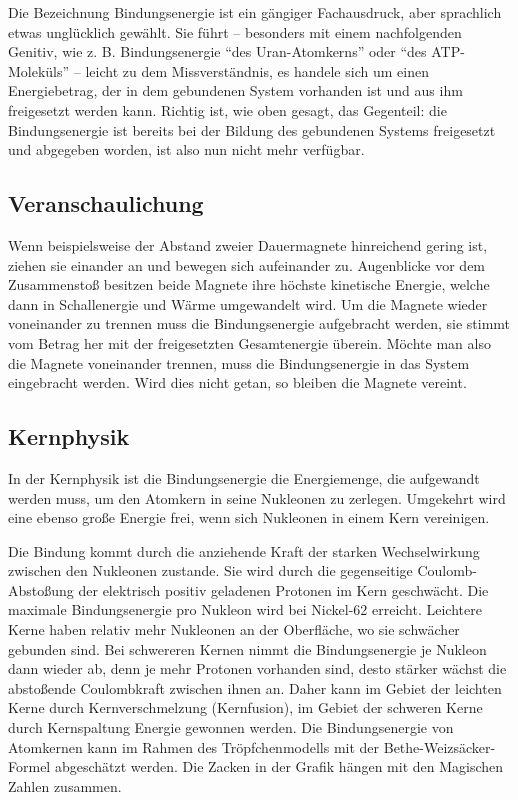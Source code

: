 \documentclass[12pt,a4paper,twoside]{article}
\begin{document}
Die Bezeichnung Bindungsenergie ist ein gängiger Fachausdruck, aber sprachlich etwas unglücklich gewählt. 
Sie führt -- besonders mit einem nachfolgenden Genitiv, wie z. B. Bindungsenergie ``des Uran-Atomkerns'' oder ``des ATP-Moleküls'' -- 
leicht zu dem Missverständnis, es handele sich um einen Energiebetrag, der in dem gebundenen System vorhanden 
ist und aus ihm freigesetzt werden kann. Richtig ist, wie oben gesagt, das Gegenteil: 
die Bindungsenergie ist bereits bei der Bildung des gebundenen Systems freigesetzt und abgegeben worden, ist also nun nicht mehr verfügbar.

\subsection*{Veranschaulichung}

Wenn beispielsweise der Abstand zweier Dauermagnete hinreichend gering ist, ziehen sie einander an und bewegen sich aufeinander zu. 
Augenblicke vor dem Zusammenstoß besitzen beide Magnete ihre höchste kinetische Energie, welche dann in Schallenergie und Wärme umgewandelt wird. 
Um die Magnete wieder voneinander zu trennen muss die Bindungsenergie aufgebracht werden, sie stimmt vom Betrag her mit der freigesetzten 
Gesamtenergie überein. Möchte man also die Magnete voneinander trennen, muss die Bindungsenergie in das System eingebracht werden. 
Wird dies nicht getan, so bleiben die Magnete vereint.

\subsection*{Kernphysik}

In der Kernphysik ist die Bindungsenergie die Energiemenge, die aufgewandt werden muss, um den Atomkern in seine Nukleonen zu zerlegen. Umgekehrt wird eine ebenso große Energie frei, wenn sich Nukleonen in einem Kern vereinigen.

Die Bindung kommt durch die anziehende Kraft der starken Wechselwirkung zwischen den Nukleonen zustande. Sie wird durch die gegenseitige Coulomb-Abstoßung der elektrisch positiv geladenen Protonen im Kern geschwächt. Die maximale Bindungsenergie pro Nukleon wird bei Nickel-62 erreicht. Leichtere Kerne haben relativ mehr Nukleonen an der Oberfläche, wo sie schwächer gebunden sind. Bei schwereren Kernen nimmt die Bindungsenergie je Nukleon dann wieder ab, denn je mehr Protonen vorhanden sind, desto stärker wächst die abstoßende Coulombkraft zwischen ihnen an. Daher kann im Gebiet der leichten Kerne durch Kernverschmelzung (Kernfusion), im Gebiet der schweren Kerne durch Kernspaltung Energie gewonnen werden. Die Bindungsenergie von Atomkernen kann im Rahmen des Tröpfchenmodells mit der Bethe-Weizsäcker-Formel abgeschätzt werden. Die Zacken in der Grafik hängen mit den Magischen Zahlen zusammen.
\end{document}
